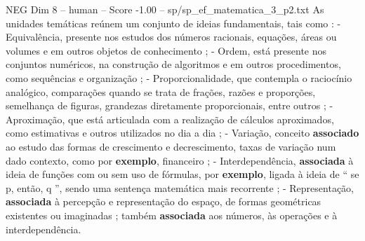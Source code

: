 \begin{textsample}{NEG Dim 8 – human – Score -1.00 – sp/sp\_ef\_matematica\_3\_p2.txt}  \label{ex:f8_neg_018}
As unidades temáticas reúnem um conjunto de ideias fundamentais, tais como : - Equivalência, presente nos estudos dos números racionais, equações, áreas ou volumes e em outros objetos de conhecimento ; - Ordem, está presente nos conjuntos numéricos, na construção de algoritmos e em outros procedimentos, como sequências e organização ; - Proporcionalidade, que contempla o raciocínio analógico, comparações quando se trata de frações, razões e proporções, semelhança de figuras, grandezas diretamente proporcionais, entre outros ; - Aproximação, que está articulada com a realização de cálculos aproximados, como estimativas e outros utilizados no dia a dia ; - Variação, conceito \textbf{associado} ao estudo das formas de crescimento e decrescimento, taxas de variação num dado contexto, como por \textbf{exemplo}, financeiro ; - Interdependência, \textbf{associada} à ideia de funções com ou sem uso de fórmulas, por \textbf{exemplo}, ligada à ideia de “ se p, então, q ”, sendo uma sentença matemática mais recorrente ; - Representação, \textbf{associada} à percepção e representação do espaço, de formas geométricas existentes ou imaginadas ; também \textbf{associada} aos números, às operações e à interdependência.

\end{textsample}
